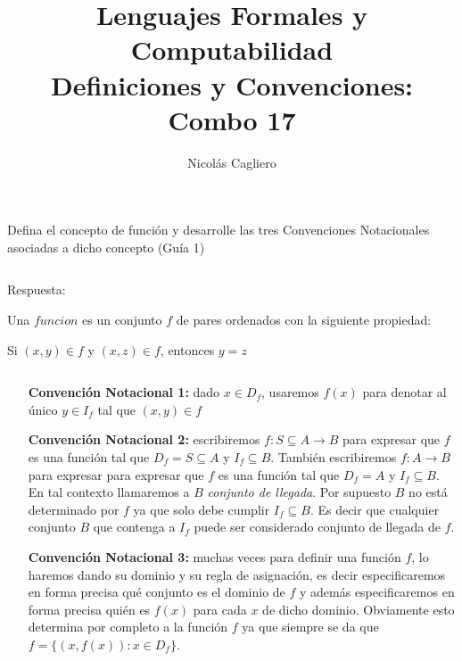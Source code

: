 \documentclass{article}
\title{Lenguajes Formales y Computabilidad \\
        \large Definiciones y Convenciones: Combo 17 }
\author{Nicolás Cagliero}
\begin{document}
\maketitle

Defina el concepto de función y desarrolle las tres Convenciones
Notacionales asociadas a dicho concepto (Guía 1)

\(\)
\begin{center}
    Respuesta: 
    \(\)
\end{center}

Una $funcion$ es un conjunto $f$ de pares ordenados con la siguiente propiedad:
\begin{center}
        Si $(x, y) \in f$ y $(x, z) \in f$, entonces $y = z$
\end{center}
\(\)

\begin{itemize}
        \item[\textbf{Convención Notacional 1:}] dado $x \in D_f$, usaremos 
        $f(x)$ para denotar al único $y \in I_f$ tal que $(x, y) \in f$
        \item[\textbf{Convención Notacional 2:}] escribiremos $f : S \subseteq A \rightarrow B$ 
        para expresar que $f$ es una función tal que $D_f = S \subseteq A$ y $I_f \subseteq B$.
        También escribiremos $f : A \rightarrow B$ para expresar para expresar que $f$ es una 
        función tal que $D_f = A$ y $I_f \subseteq B$. En tal contexto llamaremos a 
        $B$ \textit{conjunto de llegada}. Por supuesto $B$ no está determinado por $f$ ya que 
        solo debe cumplir $I_f \subseteq B$. Es decir que cualquier conjunto $B$ que contenga a 
        $I_f$ puede ser considerado conjunto de llegada de $f$.
        \item[\textbf{Convención Notacional 3:}] muchas veces para definir una función $f$, lo haremos 
        dando su dominio y su regla de asignación, es decir especificaremos en forma precisa qué 
        conjunto es el dominio de $f$ y además especificaremos en forma precisa quién es $f(x)$ para cada 
        $x$ de dicho dominio. Obviamente esto determina por completo a la función $f$ ya que siempre se da 
        que $f = \{(x, f(x)) : x \in D_f\}$.
\end{itemize}
\end{document}
